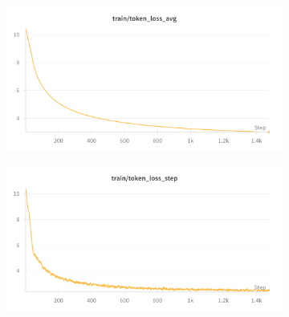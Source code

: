 \documentclass[11pt,a4paper]{article}
\begin{document}
\begin{figure}[h!]
    \centering
    \begin{subfigure}[b]{0.48\textwidth}
        \centering
        \includegraphics[width=\textwidth]{train_loss_avg.png}
        \label{fig:train_loss}
    \end{subfigure}
    \hfill
    \begin{subfigure}[b]{0.48\textwidth}
        \centering
        \includegraphics[width=\textwidth]{train_loss_step.png}
        \label{fig:train_loss_step}
    \end{subfigure}
    
    \vspace{0.5em}
    

\end{figure}
\end{document}
